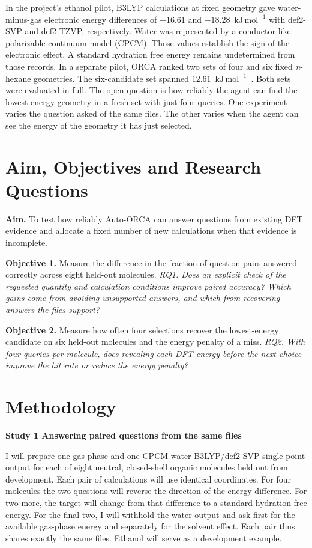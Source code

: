 \documentclass[12pt,a4paper]{article}
\newcommand{\subhead}[1]{\par\addvspace{0.4em}\textbf{#1}\par\nobreak}
\newcommand{\unitE}{\ensuremath{\mathrm{kJ\,mol^{-1}}}}
\begin{document}
In the project's ethanol pilot, B3LYP calculations at fixed geometry gave
water-minus-gas electronic energy differences of $-16.61$ and $-18.28$~\unitE{}
with def2-SVP and def2-TZVP, respectively. Water was represented by a
conductor-like polarizable continuum model (CPCM). Those values establish
the sign of the electronic effect. A standard hydration free energy remains
undetermined from those records. In a separate pilot, ORCA ranked two sets
of four and six fixed \emph{n}-hexane geometries. The six-candidate set spanned
$12.61$~\unitE{}~\cite{archive}. Both sets were evaluated in full. The open
question is how reliably the agent can find the lowest-energy geometry in
a fresh set with just four queries. One experiment varies the question
asked of the same files. The other varies when the agent can see the energy
of the geometry it has just selected.

\clearpage
\section{Aim, Objectives and Research Questions}
\textbf{Aim.} To test how reliably Auto-ORCA can answer questions from existing
DFT evidence and allocate a fixed number of new calculations when that evidence
is incomplete.

\textbf{Objective 1.} Measure the difference in the fraction of question pairs
answered correctly across eight held-out molecules.
\emph{RQ1. Does an explicit check of the requested quantity and calculation
conditions improve paired accuracy? Which gains come from avoiding unsupported
answers, and which from recovering answers the files support?}

\textbf{Objective 2.} Measure how often four selections recover the
lowest-energy candidate on six held-out molecules and the energy penalty of a miss.
\emph{RQ2. With four queries per molecule, does revealing each DFT energy before
the next choice improve the hit rate or reduce the energy penalty?}

\section{Methodology}
\subhead{Study 1 \enspace Answering paired questions from the same files}
I will prepare one gas-phase and one CPCM-water B3LYP/def2-SVP single-point
output for each of eight neutral, closed-shell organic molecules held out from
development. Each pair of calculations will use identical coordinates. For four
molecules the two questions will reverse the direction of the energy difference.
For two more, the target will change from that difference to a standard
hydration free energy. For the final two, I will withhold the water output
and ask first for the available gas-phase energy and separately for the solvent
effect. Each pair thus shares exactly the same files. Ethanol will serve as a
development example.
\end{document}
